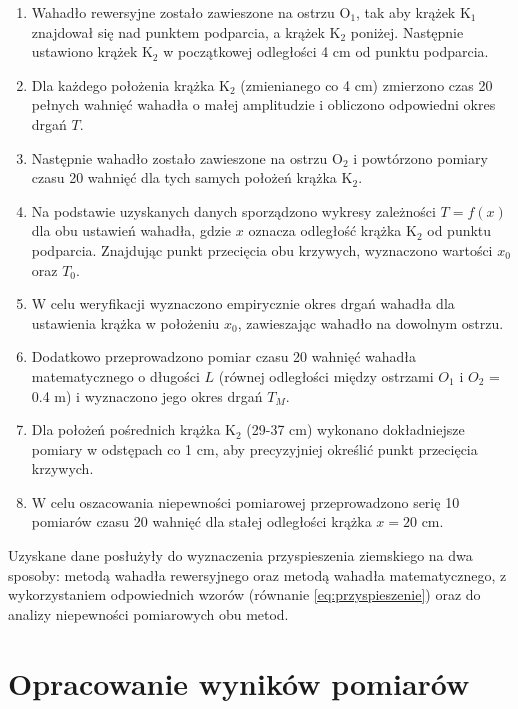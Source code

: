 \documentclass[a4paper,12pt]{article}
\begin{document}
\begin{enumerate}
  \item Wahadło rewersyjne zostało zawieszone na ostrzu O$_1$, tak aby krążek K$_1$ znajdował się nad punktem podparcia, a krążek K$_2$ poniżej. Następnie ustawiono krążek K$_2$ w początkowej odległości 4 cm od punktu podparcia.

  \item Dla każdego położenia krążka K$_2$ (zmienianego co 4 cm) zmierzono czas 20 pełnych wahnięć wahadła o małej amplitudzie i obliczono odpowiedni okres drgań $T$.

  \item Następnie wahadło zostało zawieszone na ostrzu O$_2$ i powtórzono pomiary czasu 20 wahnięć dla tych samych położeń krążka K$_2$.

  \item Na podstawie uzyskanych danych sporządzono wykresy zależności $T=f(x)$ dla obu ustawień wahadła, gdzie $x$ oznacza odległość krążka K$_2$ od punktu podparcia. Znajdując punkt przecięcia obu krzywych, wyznaczono wartości $x_0$ oraz $T_0$.

  \item W celu weryfikacji wyznaczono empirycznie okres drgań wahadła dla ustawienia krążka w położeniu $x_0$, zawieszając wahadło na dowolnym ostrzu.

  \item Dodatkowo przeprowadzono pomiar czasu 20 wahnięć wahadła matematycznego o długości $L$ (równej odległości między ostrzami $O_1$ i $O_2$ = 0.4 m) i wyznaczono jego okres drgań $T_M$.

  \item Dla położeń pośrednich krążka K$_2$ (29-37 cm) wykonano dokładniejsze pomiary w odstępach co 1 cm, aby precyzyjniej określić punkt przecięcia krzywych.

  \item W celu oszacowania niepewności pomiarowej przeprowadzono serię 10 pomiarów czasu 20 wahnięć dla stałej odległości krążka $x=20$ cm.
\end{enumerate}

Uzyskane dane posłużyły do wyznaczenia przyspieszenia ziemskiego na dwa sposoby: metodą wahadła rewersyjnego oraz metodą wahadła matematycznego, z wykorzystaniem odpowiednich wzorów (równanie \ref{eq:przyspieszenie}) oraz do analizy niepewności pomiarowych obu metod.

\section{Opracowanie wyników pomiarów}
\end{document}
